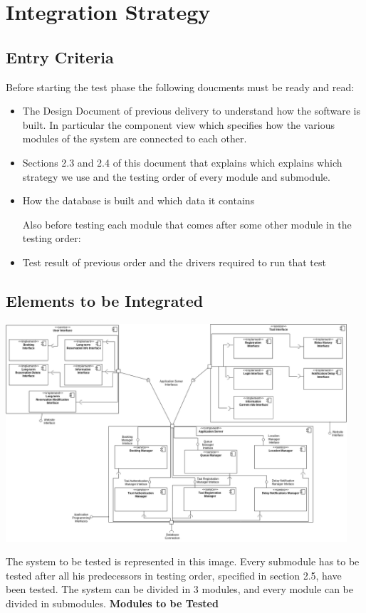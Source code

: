 \section{Integration Strategy}
\subsection{Entry Criteria}
	Before starting the test phase the following doucments must be ready and read:
	\begin{itemize}
		\item The Design Document of previous delivery to understand how the software is built. In particular the component view which specifies how the various modules of the system are connected to each other.
		\item Sections 2.3 and 2.4 of this document that explains which explains which strategy we use and the testing order of every module and submodule.
		\item How the database is built and which data it contains
		
		Also before testing each module that comes after some other module in the testing order:
		
		\item Test result of previous order and the drivers required to run that test
	\end{itemize} 
\subsection{Elements to be Integrated}
		\begin{center}
			\includegraphics[width=0.95\textwidth]{./images/test_modules.png}
		\end{center}
		The system to be tested is represented in this image. Every submodule has to be tested after all his predecessors in testing order, specified in section 2.5, have been tested. The system can be divided in 3 modules, and every module can be divided in submodules.
		\newline
		\newline
		\noindent \textbf{Modules to be Tested}
		
